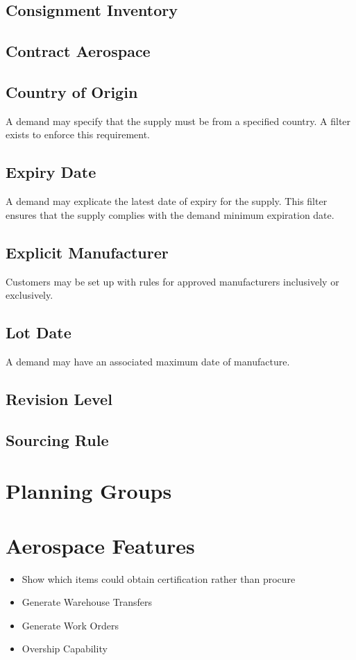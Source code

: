 \subsection{Consignment Inventory}
\subsection{Contract Aerospace}
\subsection{Country of Origin}
A demand may specify that the supply must be from a specified country.  A filter exists to enforce this 
requirement.
\subsection{Expiry Date}
A demand may explicate the latest date of expiry for the supply.  This filter ensures that the supply complies with
the demand minimum expiration date.
\subsection{Explicit Manufacturer}
Customers may be set up with rules for approved manufacturers inclusively or exclusively.
\subsection{Lot Date}
A demand may have an associated maximum date of manufacture.
\subsection{Revision Level}

\subsection{Sourcing Rule}

\section{Planning Groups}


\section{Aerospace Features}
\begin{itemize}
 \item Show which items could obtain certification rather than procure
 \item Generate Warehouse Transfers
 \item Generate Work Orders
 \item Overship Capability
\end{itemize}

